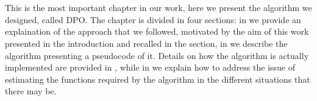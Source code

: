 \chapter{}
This is the most important chapter in our work, here we present the algorithm we designed, called \acf{DPO}. The chapter is divided in four sections: in  we provide an explaination of the approach that we followed, motivated by the aim of this work presented in the introduction and recalled in the section, in  we describe the algorithm presenting a pseudocode of it. Details on how the algorithm is actually implemented are provided in , while in  we explain how to address the issue of estimating the functions required by the algorithm in the different situations that there may be.
 
